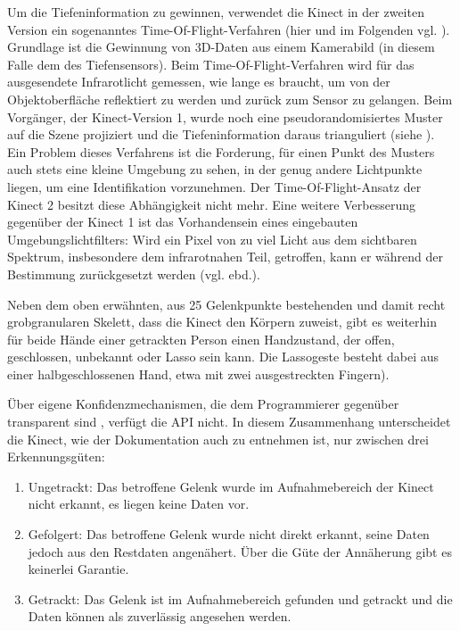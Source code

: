 Um die Tiefeninformation zu gewinnen, verwendet die Kinect in der zweiten Version ein sogenanntes Time-Of-Flight-Verfahren (hier und im Folgenden vgl. \cite{heise}). Grundlage ist die Gewinnung von 3D-Daten aus einem Kamerabild (in diesem Falle dem des Tiefensensors). Beim Time-Of-Flight-Verfahren wird für das ausgesendete Infrarotlicht gemessen, wie lange es braucht, um von der Objektoberfläche reflektiert zu werden und zurück zum Sensor zu gelangen. Beim Vorgänger, der Kinect-Version 1, wurde noch eine pseudorandomisiertes Muster auf die Szene projiziert und die Tiefeninformation daraus trianguliert (siehe \cite{gamasutra}). Ein Problem dieses Verfahrens ist die Forderung, für einen Punkt des Musters auch stets eine kleine Umgebung zu sehen, in der genug andere Lichtpunkte liegen, um eine Identifikation vorzunehmen. Der Time-Of-Flight-Ansatz der Kinect 2 besitzt diese Abhängigkeit nicht mehr. Eine weitere Verbesserung gegenüber der Kinect 1 ist das Vorhandensein eines eingebauten Umgebungslichtfilters: Wird ein Pixel von zu viel Licht aus dem sichtbaren Spektrum, insbesondere dem infrarotnahen Teil, getroffen, kann er während der Bestimmung zurückgesetzt werden (vgl. ebd.).\par 
Neben dem oben erwähnten, aus 25 Gelenkpunkte bestehenden und damit recht grobgranularen Skelett, dass die Kinect den Körpern zuweist, gibt es weiterhin für beide Hände einer getrackten Person einen \glqq{}Handzustand\grqq{}, der \glqq{}offen\grqq{}, \glqq{}geschlossen\grqq{}, \glqq{}unbekannt\grqq{} oder \glqq{}Lasso\grqq{} sein kann. Die Lassogeste besteht dabei aus einer halbgeschlossenen Hand, etwa mit zwei ausgestreckten Fingern).\par
Über eigene Konfidenzmechanismen, die dem Programmierer gegenüber transparent sind , verfügt die API nicht. In diesem Zusammenhang unterscheidet die Kinect, wie der Dokumentation \cite{trackingstate} auch zu entnehmen ist, nur zwischen drei Erkennungsgüten:
\begin{enumerate}
\item Ungetrackt: Das betroffene Gelenk wurde im Aufnahmebereich der Kinect nicht erkannt, es liegen keine Daten vor.
\item Gefolgert: Das betroffene Gelenk wurde nicht direkt erkannt, seine Daten jedoch aus den Restdaten angenähert. Über die Güte der Annäherung gibt es keinerlei Garantie.
\item Getrackt: Das Gelenk ist im Aufnahmebereich gefunden und getrackt und die Daten können als zuverlässig angesehen werden.
\end{enumerate}
